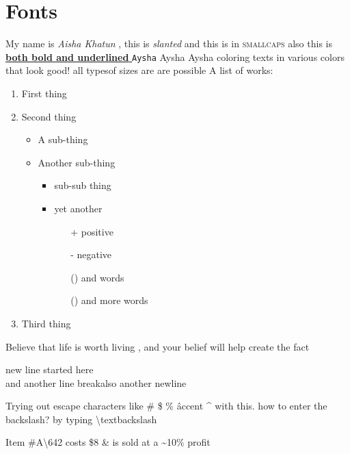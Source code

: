 \documentclass[a4paper,12pt]{article}
\begin{document}
\section{Fonts}
My name is \textit{Aisha Khatun} , this is \textsl{slanted} and this is  in \textsc{smallcaps} also this is \underline{\textbf{both bold and underlined} }
\texttt{Aysha}  \textsf {Aysha }  \textrm{Aysha }
{\color{blue}coloring texts in various colors} {\color{cyan} that look good!}
{\huge all types}{\LARGE of sizes are }{\small are possible}
A list of works:
\begin{enumerate}
\item First thing
\item Second thing
\begin{itemize}
\item A sub-thing
\item Another sub-thing
\begin{itemize}
\item sub-sub thing
\item yet another
\begin{itemize}
\item[+] positive
\item[-] negative
\item[()] and words
\item[()] and more words
\end{itemize}
\end{itemize}
\end{itemize}
\item Third thing
\end{enumerate}

Believe that life is worth living%
, and your belief will help create the fact

new line  started here\\and another line break\newline also another newline

Trying out escape  characters like \# \$ \% \^ accent \^{} with this. how to enter the backslash? by typing \textbackslash textbackslash

Item \#A\textbackslash 642 costs \$8 \& is sold at a \~{}10\% profit
\end{document}
